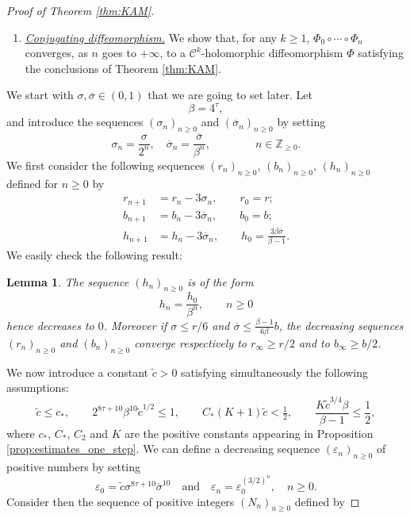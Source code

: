 \documentclass[10pt]{article}
\newtheorem{lemma}[theorem]{Lemma}
\newcommand{\Z}{\mathbb{Z}}
\begin{document}
\begin{proof}[Proof of Theorem \ref{thm:KAM}]
\begin{enumerate}
    \item {\it\underline{Conjugating diffeomorphism.}} We show that, for any $k \geq 1$, $\Phi_0\circ\cdots\circ\Phi_n$ converges, as $n$ goes to $+\infty$, to a $\mathscr C^{k}$-holomorphic diffeomorphism $\Phi$ satisfying the conclusions of Theorem \ref{thm:KAM}.
\end{enumerate}

\vspace{0.2cm}
We start with $\sigma,\overline\sigma\in(0,1)$ that we are going to set later. Let 
\[
\beta = 4^\tau,
\]
and introduce the sequences $(\sigma_n)_{n\geq 0}$ and $(\overline\sigma_n)_{n\geq 0}$ by setting
\[
\sigma_n = \frac{\sigma}{2^n},
\quad
\overline\sigma_n = \frac{\overline\sigma}{\beta^n},
\qquad\qquad n\in\Z_{\geq 0}.
\]
We first consider the following sequences $(r_n)_{n\geq 0}$, $(b_n)_{n\geq 0}$, $(h_n)_{n\geq 0}$ defined for $n\geq 0$ by
\begin{align*}
r_{n+1} & =  r_n-3\sigma_n, \qquad r_0=r;\\
b_{n+1} & =  b_n-3\overline\sigma_n, \qquad b_0=b;\\
h_{n+1} & =  h_n-3\overline\sigma_n, \qquad h_0=\tfrac{3\beta\overline\sigma}{\beta-1}.
\end{align*}
We easily check the following result:
\begin{lemma}
    \label{lemma:prop_seq_strips}
    The sequence $(h_n)_{n\geq 0}$ is of the form
    \[
    h_n = \frac{h_0}{\beta^n},\qquad n\geq 0
    \]
    hence decreases to $0$.
    Moreover if $\sigma\leq r/6$ and $\overline\sigma\leq \frac{\beta-1}{6\beta}b$, the decreasing sequences $(r_n)_{n\geq 0}$ and $(b_n)_{n\geq 0}$ converge respectively to $r_\infty\geq r/2$ and to $b_\infty\geq b/2$.
\end{lemma}

We now introduce a constant $\tilde c>0$ satisfying simultaneously the following assumptions:
\begin{equation}
    \label{eq:tilde_c}
    \tilde c\leq c_\ast,
    \qquad
    2^{8\tau+10}\beta^{10}\tilde c^{1/2}\leq 1,
    \qquad
    C_\ast(K+1)\tilde c < \tfrac{1}{2},
    \qquad
    \frac{K\tilde c^{3/4}\beta}{\beta-1}\leq\frac{1}{2},
\end{equation}
where $c_\ast$, $C_\ast$, $C_2$ and $K$ are the positive constants appearing in Proposition \ref{prop:estimates_one_step}.
We can define a decreasing sequence $(\varepsilon_n)_{n\geq0}$ of positive numbers by setting
\[
\varepsilon_0 = \tilde c\sigma^{8\tau+10}\overline\sigma^{10}
\quad\text{and}\quad 
\varepsilon_n = \varepsilon_0^{(3/2)^n},
\quad n\geq 0.
\]
Consider then the sequence of positive integers 
$(N_n)_{n\geq 0}$ defined by 


\end{proof}
\end{document}
